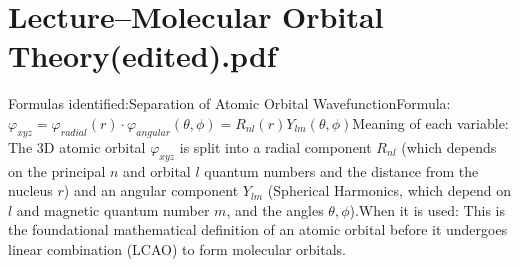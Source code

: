 \documentclass[11pt, a4paper]{report}
\begin{document}
\chapter{Lecture--Molecular Orbital Theory(edited).pdf}
Formulas identified:Separation of Atomic Orbital WavefunctionFormula: $\varphi_{xyz} = \varphi_{radial}(r) \cdot \varphi_{angular}(\theta, \phi) = R_{nl}(r) Y_{lm}(\theta, \phi)$Meaning of each variable: The 3D atomic orbital $\varphi_{xyz}$ is split into a radial component $R_{nl}$ (which depends on the principal $n$ and orbital $l$ quantum numbers and the distance from the nucleus $r$) and an angular component $Y_{lm}$ (Spherical Harmonics, which depend on $l$ and magnetic quantum number $m$, and the angles $\theta, \phi$).When it is used: This is the foundational mathematical definition of an atomic orbital before it undergoes linear combination (LCAO) to form molecular orbitals.
\end{document}

